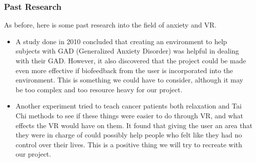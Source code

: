 \documentclass[a4paper,10pt]{article}
\begin{document}
\subsubsection{Past Research}
As before, here is some past research into the field of anxiety and VR.
\begin{itemize}
	\item A study done in 2010 concluded that creating an environment to help subjects with GAD (Generalized Anxiety Disorder) was helpful in dealing with their GAD.  However, it also discovered that the project could be made even more effective if biofeedback from the user is incorporated into the environment.  This is something we could have to consider, although it may be too complex and too resource heavy for our project. \cite{calmOne}
	\item Another experiment tried to teach cancer patients both relaxation and Tai Chi methods to see if these things were easier to do through VR, and what effects the VR would have on them.  It found that giving the user an area that they were in charge of could possibly help people who felt like they had no control over their lives. This is a positive thing we will try to recreate with our project.
\end{itemize}
\pagebreak
\end{document}

